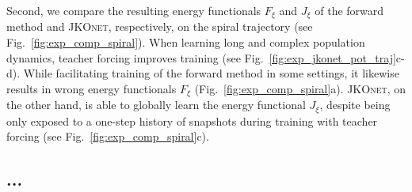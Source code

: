 Second, we compare the resulting energy functionals $F_\xi$ and $J_\xi$ of the forward method and \textsc{JKOnet}, respectively, on the spiral trajectory (see Fig.~\ref{fig:exp_comp_spiral}).
When learning long and complex population dynamics, teacher forcing improves training (see Fig.~\ref{fig:exp_jkonet_pot_traj}c-d).
While facilitating training of the forward method in some settings, it likewise results in wrong energy functionals $F_\xi$ (Fig.~\ref{fig:exp_comp_spiral}a).
\textsc{JKOnet}, on the other hand, is able to globally learn the energy functional $J_\xi$, despite being only exposed to a one-step history of snapshots during training with teacher forcing (see Fig.~\ref{fig:exp_comp_spiral}c).

\subsection{...} \label{sec:eval_cell}

